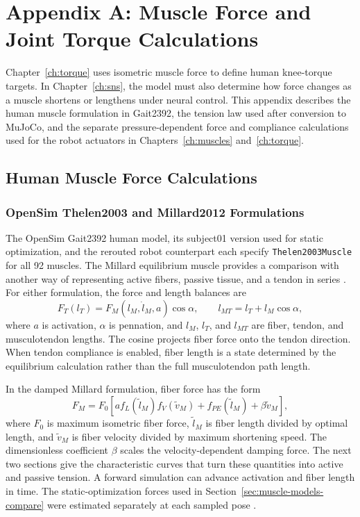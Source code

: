 \chapter{Appendix A: Muscle Force and Joint Torque Calculations}\label{app:muscle_calcs}
\graphicspath{{../Figures/92-AppendixA/}{figs/92-AppendixA/}}

Chapter~\ref{ch:torque} uses isometric muscle force to define human knee-torque targets. In Chapter~\ref{ch:sns}, the model must also determine how force changes as a muscle shortens or lengthens under neural control. This appendix describes the human muscle formulation in Gait2392, the tension law used after conversion to MuJoCo, and the separate pressure-dependent force and compliance calculations used for the robot actuators in Chapters~\ref{ch:muscles} and~\ref{ch:torque}.

\section{Human Muscle Force Calculations}
\subsection{OpenSim Thelen2003 and Millard2012 Formulations}\label{sec:app_opensim_curves}

The OpenSim Gait2392 human model, its subject01 version used for static optimization, and the rerouted robot counterpart each specify \texttt{Thelen2003Muscle} for all 92 muscles. The Millard equilibrium muscle provides a comparison with another way of representing active fibers, passive tissue, and a tendon in series \citep{thelen_adjustment_2003,millard_flexing_2013}. For either formulation, the force and length balances are
\begin{equation}
 F_T(l_T)=F_M(l_M,\dot l_M,a)\cos\alpha,
 \qquad l_{MT}=l_T+l_M\cos\alpha,
 \label{eq:app_muscle_equilibrium}
\end{equation}
where $a$ is activation, $\alpha$ is pennation, and $l_M$, $l_T$, and $l_{MT}$ are fiber, tendon, and musculotendon lengths. The cosine projects fiber force onto the tendon direction. When tendon compliance is enabled, fiber length is a state determined by the equilibrium calculation rather than the full musculotendon path length.

In the damped Millard formulation, fiber force has the form
\begin{equation}
 F_M=F_0\left[a f_L(\tilde l_M)f_V(\tilde v_M)
 + f_{PE}(\tilde l_M)+\beta\tilde v_M\right],
 \label{eq:app_millard_force}
\end{equation}
where $F_0$ is maximum isometric fiber force, $\tilde l_M$ is fiber length divided by optimal length, and $\tilde v_M$ is fiber velocity divided by maximum shortening speed. The dimensionless coefficient $\beta$ scales the velocity-dependent damping force. The next two sections give the characteristic curves that turn these quantities into active and passive tension. A forward simulation can advance activation and fiber length in time. The static-optimization forces used in Section~\ref{sec:muscle-models-compare} were estimated separately at each sampled pose \citep{opensim_static_optimization_docs}.

